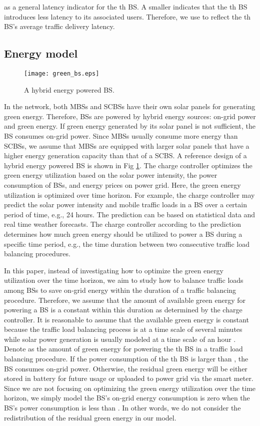 \documentclass[journal]{IEEEtran}
\theoremstyle{definition}
\begin{document}
as a general latency indicator for the th BS. A smaller  indicates that the th BS introduces less latency to its associated users. Therefore, we use  to reflect the th BS's average traffic delivery latency.
\subsection{Energy model}
\begin{figure}
\centering
\texttt{[image: green\_bs.eps]}
\caption{A hybrid energy powered BS.}
\label{fig:green_bs}
\vspace{-16pt}
\end{figure}
In the network, both MBSs and SCBSs have their own solar panels for generating green energy. Therefore, BSs are powered by hybrid energy sources: on-grid power and green energy. If green energy generated by its solar panel is not sufficient, the BS consumes on-grid power. Since MBSs usually consume more energy than SCBSs, we assume that MBSs are equipped with larger solar panels that have a higher energy generation capacity than that of a SCBS. A reference design of a hybrid energy powered BS \cite{Han:2014:PMN} is shown in Fig \ref{fig:green_bs}. The charge controller optimizes the green energy utilization based on the solar power intensity, the power consumption of BSs, and energy prices on power grid. Here, the green energy utilization is optimized over time horizon. For example, the charge controller may predict the solar power intensity and mobile traffic loads in a BS over a certain period of time, e.g., 24 hours. The prediction can be based on statistical data and real time weather forecasts. The charge controller according to the prediction determines how much green energy should be utilized to power a BS during a specific time period, e.g., the time duration between two consecutive traffic load balancing procedures.

In this paper, instead of investigating how to optimize the green energy utilization over the time horizon, we aim to study how to balance traffic loads among BSs to save on-grid energy within the duration of a traffic balancing procedure. Therefore, we assume that the amount of available green energy for powering a BS is a constant within this duration as determined by the charge controller. It is reasonable to assume that the available green energy is constant because the traffic load balancing process is at a time scale of several minutes \cite{Kim:2012:DOU} while solar power generation is usually modeled at a time scale of an hour \cite{Farbod:2007:RAO}. Denote  as the amount of green energy for powering the th BS in a traffic load balancing procedure. If the power consumption of the th BS is larger than , the BS consumes on-grid power. Otherwise, the residual green energy will be either stored in battery for future usage or uploaded to power grid via the smart meter. Since we are not focusing on optimizing the green energy utilization over the time horizon, we simply model the BS's on-grid energy consumption is zero when the BS's power consumption is less than . In other words, we do not consider the redistribution of the residual green energy in our model.
\end{document}
